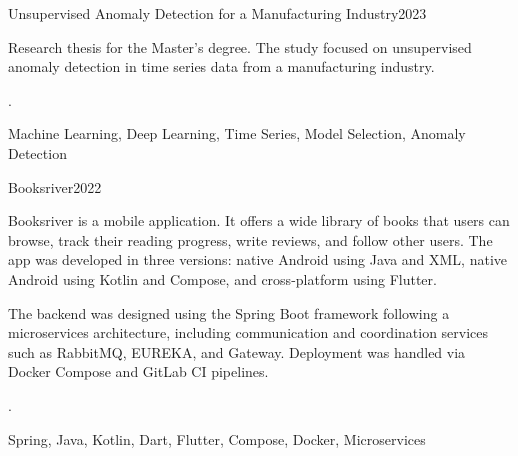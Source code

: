 
\begin{projects}

	\project
	{Unsupervised Anomaly Detection for a Manufacturing Industry}{2023}
	{Research thesis for the Master's degree. The study focused on unsupervised anomaly detection in time series data from a manufacturing industry.
		
		. }
	{Machine Learning, Deep Learning, Time Series, Model Selection, Anomaly Detection}
	
	\project
	{Booksriver}{2022}
	{Booksriver is a mobile application. It offers a wide library of books that users can browse, track their reading progress, write reviews, and follow other users. The app was developed in three versions: native Android using Java and XML, native Android using Kotlin and Compose, and cross-platform using Flutter.
		
		The backend was designed using the Spring Boot framework following a microservices architecture, including communication and coordination services such as RabbitMQ, EUREKA, and Gateway. Deployment was handled via Docker Compose and GitLab CI pipelines.
		
		. }
	{Spring, Java, Kotlin, Dart, Flutter, Compose, Docker, Microservices}

\end{projects}

